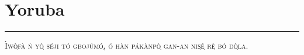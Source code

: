 \vspace{-1em}\section*{\checkno Yoruba}
\vspace{-.5em}\hrule\vspace{.5em}
\noindent\textsc{
Ìwò̩fà ń yò̩ séji tó gbojúmó̩, ó hàn pákànpò̩ gan-an nis̩é̩ rè̩ bó dò̩la.
}